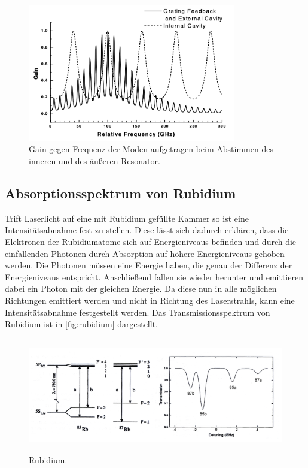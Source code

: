 \begin{figure}[H]
    \centering
    \includegraphics[height=6cm]{content/pics/moden.png}
    \caption{Gain gegen Frequenz der Moden aufgetragen beim Abstimmen des inneren und des äußeren Resonator. 
    \cite{V60}}
\end{figure}

\subsection{Absorptionsspektrum von Rubidium}
Trift Laserlicht auf eine mit Rubidium gefüllte Kammer so ist eine Intensitätsabnahme fest zu stellen. Diese lässt
sich dadurch erklären, dass die Elektronen der Rubidiumatome sich auf Energieniveaus befinden und durch die
einfallenden Photonen durch Absorption auf höhere Energieniveaus gehoben werden.
Die Photonen müssen eine Energie haben, die genau der Differenz der Energieniveaus entspricht. Anschließend fallen
sie wieder herunter und emittieren dabei ein Photon mit der gleichen Energie. Da diese nun in alle möglichen
Richtungen emittiert werden und nicht in Richtung des Laserstrahls, kann eine Intensitätsabnahme festgestellt werden.
Das Transmissionsspektrum von Rubidium ist in \autoref{fig:rubidium} dargestellt.

\begin{figure}[H]
    \centering
    \includegraphics[height=5cm]{content/pics/Rubidium.png}
    \caption{Rubidium. \cite{V60}}
    \label{fig:rubidium}
\end{figure}

